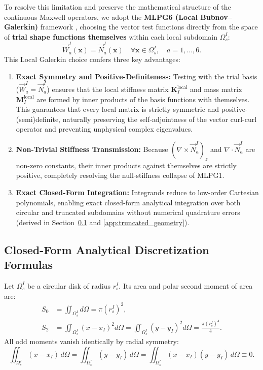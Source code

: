 \documentclass[VANCOUVER,Times1COL]{WileyNJD-v5}
\begin{document}
To resolve this limitation and preserve the mathematical structure of the continuous Maxwell operators, we adopt the \textbf{MLPG6 (Local Bubnov--Galerkin)} framework \cite{atluri2002meshless}, choosing the vector test functions directly from the space of \textbf{trial shape functions themselves} within each local subdomain $\Omega_s^I$:
\begin{equation}
    \vec{W}_a^I(\mathbf{x}) = \vec{N}_a^I(\mathbf{x}) \quad \forall \mathbf{x} \in \Omega_s^I, \quad a = 1, \dots, 6.
    \label{eq:mlpg6_choice}
\end{equation}
This Local Galerkin choice confers three key advantages:
\begin{enumerate}
    \item \textbf{Exact Symmetry and Positive-Definiteness:} Testing with the trial basis ($\vec{W}_a^I = \vec{N}_a^I$) ensures that the local stiffness matrix $\mathbf{K}_I^{\mathrm{local}}$ and mass matrix $\mathbf{M}_I^{\mathrm{local}}$ are formed by inner products of the basis functions with themselves. This guarantees that every local matrix is strictly symmetric and positive-(semi)definite, naturally preserving the self-adjointness of the vector curl-curl operator and preventing unphysical complex eigenvalues.
    \item \textbf{Non-Trivial Stiffness Transmission:} Because $(\nabla \times \vec{N}_a^I)_z$ and $\nabla \cdot \vec{N}_a^I$ are non-zero constants, their inner products against themselves are strictly positive, completely resolving the null-stiffness collapse of MLPG1.
    \item \textbf{Exact Closed-Form Integration:} Integrands reduce to low-order Cartesian polynomials, enabling exact closed-form analytical integration over both circular and truncated subdomains without numerical quadrature errors (derived in Section~\ref{subsec:analytic_formulas} and \ref{app:truncated_geometry}).
\end{enumerate}

\subsection{Closed-Form Analytical Discretization Formulas}
\label{subsec:analytic_formulas}

Let $\Omega_s^I$ be a circular disk of radius $r_s^I$. Its area and polar second moment of area are:
\begin{equation}
    \begin{aligned}
        S_0 & = \iint_{\Omega_s^I} d\Omega = \pi (r_s^I)^2,                                                                \\
        S_2 & = \iint_{\Omega_s^I} (x - x_I)^2 d\Omega = \iint_{\Omega_s^I} (y - y_I)^2 d\Omega = \frac{\pi (r_s^I)^4}{4}.
    \end{aligned}
    \label{eq:disk_moments}
\end{equation}
All odd moments vanish identically by radial symmetry:
\begin{equation}
    \iint_{\Omega_s^I} (x - x_I) \, d\Omega = \iint_{\Omega_s^I} (y - y_I) \, d\Omega = \iint_{\Omega_s^I} (x - x_I)(y - y_I) \, d\Omega \equiv 0.
\end{equation}
\end{document}
